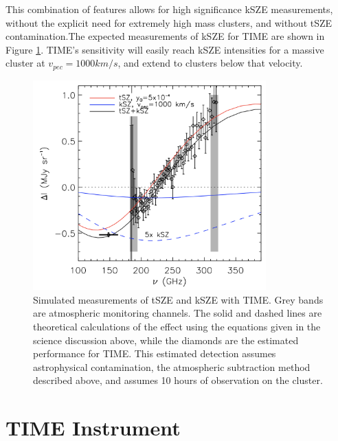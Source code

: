 \documentclass[manuscript]{aastex}
\begin{document}
This combination of features allows for high significance kSZE measurements, without the explicit need for extremely high mass clusters, and without tSZE contamination.The expected measurements of kSZE for TIME are shown in Figure \ref{fig:time1}. TIME's sensitivity will easily reach kSZE intensities for a massive cluster at $v_{pec} = 1000 km/s$, and extend to clusters below that velocity.

\begin{figure}[ht!]
\centering
\captionsetup{width=0.8\textwidth}
\includegraphics[width=0.8\textwidth]{time1.png}
\caption[Expected TIME kSZE & tSZE Measurements]{Simulated measurements of tSZE and kSZE with TIME. Grey bands are atmospheric monitoring channels. The solid and dashed lines are theoretical calculations of the effect using the equations given in the science discussion above, while the diamonds are the estimated performance for TIME. This estimated detection assumes astrophysical contamination, the atmospheric subtraction method described above, and assumes 10 hours of observation on the cluster.}
\label{fig:time1}
\end{figure}

\section{TIME Instrument}
\end{document}
